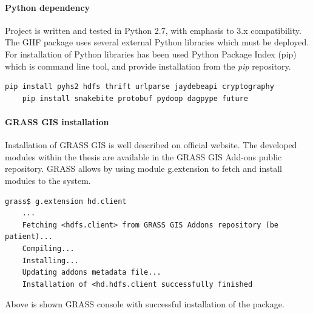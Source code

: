 \documentclass[a4paper,12pt,oneside]{report}
\begin{document}
		\paragraph{Python dependency}
		Project is written and tested in Python 2.7, with emphasis to 3.x
compatibility.
		The GHF package uses several external Python libraries which must be deployed.
For
		installation of Python libraries has been used Python Package Index (pip)
which
		is command line tool, and provide installation from the \textit{pip}
repository.
		\begin{footnotesize}
			\begin{lstlisting}[style=python]
	pip install pyhs2 hdfs thrift urlparse jaydebeapi cryptography
	pip install snakebite protobuf pydoop dagpype future
			\end{lstlisting}
		\end{footnotesize}
		
		
		\paragraph{GRASS GIS installation}
		Installation of GRASS GIS is well described on official website. The developed
		modules within the thesis are available in the GRASS GIS Add-ons public
repository.
		GRASS allows by using module g.extension to fetch and install modules to the
system.
		\begin{footnotesize}
			\begin{lstlisting}[style=python]
	grass$ g.extension hd.client
	...
	Fetching <hdfs.client> from GRASS GIS Addons repository (be patient)...
	Compiling...
	Installing...
	Updating addons metadata file...
	Installation of <hd.hdfs.client successfully finished
			\end{lstlisting}
		\end{footnotesize}
		Above is shown GRASS console with successful installation of the package. 


\newpage
\end{document}
